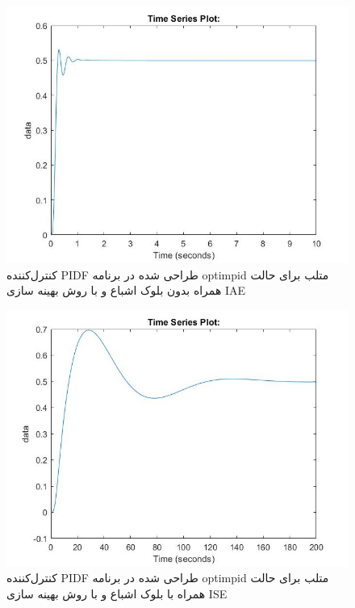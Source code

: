 \begin{figure}[H]
	\centering
	\includegraphics[width=12cm]{../Figure/P_IV/PID_IAE_without_sat.jpg}
	\caption{کنترل‌کننده PIDF طراحی شده در برنامه optimpid متلب برای حالت همراه بدون بلوک اشباع و با روش بهینه سازی IAE}
\end{figure}

\begin{figure}[H]
	\centering
	\includegraphics[width=12cm]{../Figure/P_IV/PID_ISE_with_sat.jpg}
	\caption{کنترل‌کننده PIDF طراحی شده در برنامه optimpid متلب برای حالت همراه با بلوک اشباع و با روش بهینه سازی ISE}
\end{figure}

